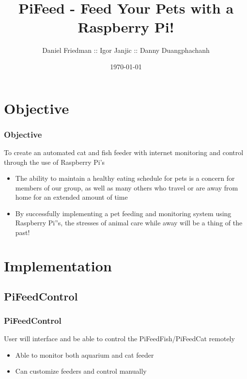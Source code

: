 \documentclass[]{beamer}
\title{PiFeed - Feed Your Pets with a Raspberry Pi!}
\author{Daniel Friedman :: Igor Janjic :: Danny Duangphachanh}
\institute{Virginia Tech}
\date{\today}
\begin{document}
\begin{frame}
  \titlepage
\end{frame}
\note{}


\section{Objective}
\begin{frame}
	\frametitle{Objective}
    To create an automated cat and fish feeder with internet monitoring and control through the use of Raspberry Pi's
    \begin{itemize}
    	\item The ability to maintain a healthy eating schedule for pets is a concern for members of our group, as well as many others who travel or are away from home for an extended amount of time
        \item By successfully implementing a pet feeding and monitoring system using Raspberry Pi''s, the stresses of animal care while away will be a thing of the past!
    \end{itemize}
\end{frame}


\section{Implementation}
\subsection{PiFeedControl}
\begin{frame}
	\frametitle{PiFeedControl}
    User will interface and be able to control the PiFeedFish/PiFeedCat remotely
    \begin{itemize}
    	\item Able to monitor both aquarium and cat feeder 
        \item Can customize feeders and control manually
    \end{itemize}
\end{frame}
\end{document}
